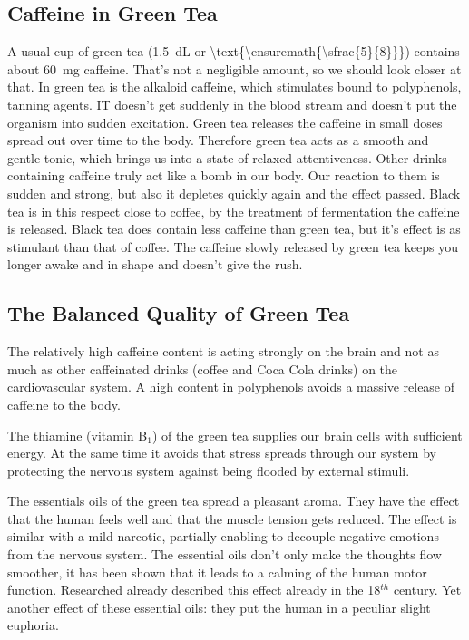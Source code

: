\documentclass[../main.tex]{subfiles}
\begin{document}
\subsection{Caffeine in Green Tea}

A usual cup of green tea (\SI{1.5}{\deci\liter} or  \SI[parse-numbers=false]{\text{\ensuremath{\sfrac{5}{8}}}}{\cup}) contains about \SI{60}{\mg} caffeine.
That's not a negligible amount, so we should look closer at that.
In green tea is the alkaloid caffeine, which stimulates bound to polyphenols, tanning agents.
IT doesn't get suddenly in the blood stream and doesn't put the organism into sudden excitation.
Green tea releases the caffeine in small doses spread out over time to the body.
Therefore green tea acts as a smooth and gentle tonic, which brings us into a state of relaxed attentiveness.
Other drinks containing caffeine truly act like a bomb in our body.
Our reaction to them is sudden and strong, but also it depletes quickly again and the effect passed.
Black tea is in this respect close to coffee, by the treatment of fermentation the caffeine is released.
Black tea does contain less caffeine than green tea, but it's effect is as stimulant than that of coffee.
The caffeine slowly released by green tea keeps you longer awake and in shape and doesn't give the rush.

\subsection{The Balanced Quality of Green Tea}

The relatively high caffeine content is acting strongly on the brain and not as much as other
caffeinated drinks (coffee and Coca Cola drinks) on the cardiovascular system.
A high content in polyphenols avoids a massive release of caffeine to the body.

The thiamine (vitamin B$_1$) of the green tea supplies our brain cells with sufficient energy.
At the same time it avoids that stress spreads through our system by protecting the nervous system against being flooded by external stimuli.

The essentials oils of the green tea spread a pleasant aroma.
They have the effect that the human feels well and that the muscle tension gets reduced.
The effect is similar with a mild narcotic, partially enabling to decouple negative emotions from the nervous system.
The essential oils don't only make the thoughts flow smoother, it has been shown that it leads to a calming of the human motor function.
Researched already described this effect already in the 18$^{th}$ century.
Yet another effect of these essential oils: they put the human in a peculiar slight euphoria.
\end{document}
